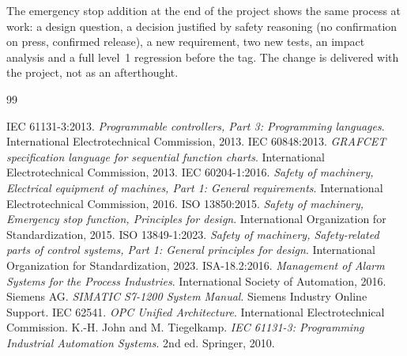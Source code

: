 \documentclass[11pt,a4paper]{report}
\begin{document}
	The emergency stop addition at the end of the project shows the same process at work: a design question, a decision justified by safety reasoning (no confirmation on press, confirmed release), a new requirement, two new tests, an impact analysis and a full level~1 regression before the tag. The change is delivered with the project, not as an afterthought.
	
	\renewcommand{\bibname}{References}
	\clearpage{}
	\begin{thebibliography}{99}
		 IEC 61131-3:2013. \textit{Programmable controllers, Part 3: Programming languages}. International Electrotechnical Commission, 2013.
		 IEC 60848:2013. \textit{GRAFCET specification language for sequential function charts}. International Electrotechnical Commission, 2013.
		 IEC 60204-1:2016. \textit{Safety of machinery, Electrical equipment of machines, Part 1: General requirements}. International Electrotechnical Commission, 2016.
		 ISO 13850:2015. \textit{Safety of machinery, Emergency stop function, Principles for design}. International Organization for Standardization, 2015.
		 ISO 13849-1:2023. \textit{Safety of machinery, Safety-related parts of control systems, Part 1: General principles for design}. International Organization for Standardization, 2023.
		 ISA-18.2:2016. \textit{Management of Alarm Systems for the Process Industries}. International Society of Automation, 2016.
		 Siemens AG. \textit{SIMATIC S7-1200 System Manual}. Siemens Industry Online Support.
		 IEC 62541. \textit{OPC Unified Architecture}. International Electrotechnical Commission.
		 K.-H. John and M. Tiegelkamp. \textit{IEC 61131-3: Programming Industrial Automation Systems}. 2nd ed. Springer, 2010.
	\end{thebibliography}
	
	\appendix
	\renewcommand{\chaptermark}[1]{\markboth{Appendix \thechapter.\ #1}{}}
	
\end{document}
